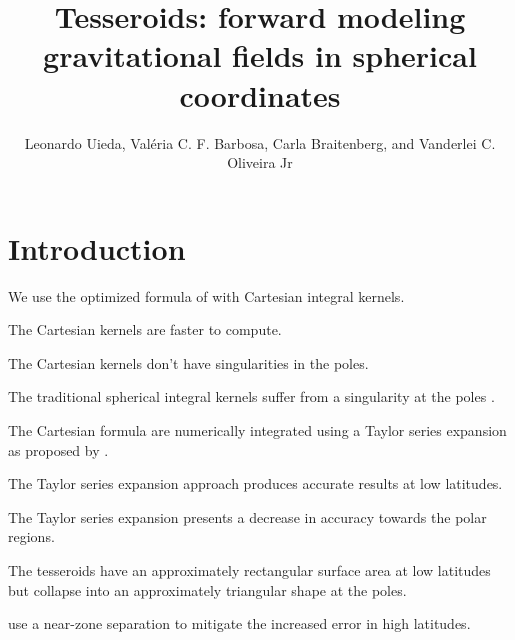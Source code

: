\documentclass[paper,twocolumn]{geophysics}
\begin{document}
\title{
Tesseroids: forward modeling gravitational fields in spherical coordinates
}

\author{
    Leonardo Uieda\footnotemark[1]\footnotemark[2],
    Val\'eria C. F. Barbosa\footnotemark[2],
    Carla Braitenberg\footnotemark[3],
    and
    Vanderlei C. Oliveira Jr\footnotemark[2]
}

\address{
\footnotemark[1]Universidade do Estado do Rio de Janeiro,
Rio de Janeiro, Brazil.
email: leouieda@gmail.com
\\
\footnotemark[2]Observat\'orio Nacional,
Rio de Janeiro, Brazil.
\\
\footnotemark[3]Department of Mathematics and Geosciences,
University of Trieste, Trieste, Italy.
}


\maketitle

\begin{abstract}
\end{abstract}

\section{Introduction}


We use the optimized formula of \citet{Grombein2013} with Cartesian integral
kernels.

The Cartesian kernels are faster to compute.

The Cartesian kernels don't have singularities in the poles.

The traditional spherical integral kernels suffer from a singularity at the
poles \citep{Heck2007, Wild-Pfeiffer2008}.

The Cartesian formula are numerically integrated using a Taylor series
expansion as proposed by \citet{Heck2007}.

The Taylor series expansion approach produces accurate results at low
latitudes.

The Taylor series expansion presents a decrease in accuracy towards the polar
regions.

The tesseroids have an approximately rectangular surface area at low latitudes
but collapse into an approximately triangular shape at the poles.

\citet{Grombein2013} use a near-zone separation to mitigate the increased error
in high latitudes.
\end{document}
